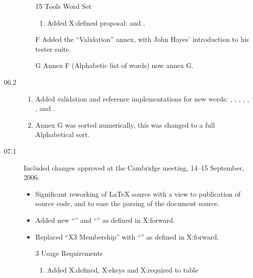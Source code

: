\begin{description}
\begin{enumerate}
	\item[15] Tools Word Set
		\begin{enumerate}
		\item Added \textsf{X:defined} proposal:
			 and
			.
		\end{enumerate}

	\item[F] Added the ``Validation'' annex, with John Hayes'
		introduction to his tester suite.

	\item[G] Annex F (Alphabetic list of words) now annex G.
	\end{enumerate}


\item[06.2]
	\begin{enumerate}
	\item Added validation and reference implementations for new words:
		,
		,
		,
		,
		,
		,
		 and
		.

	\item Annex G was sorted numerically, this was changed to a full
		Alphabetical sort.
	\end{enumerate}


\item[07.1]
	Included changes approved at the Cambridge meeting,
	14--15 September, 2006:
	\begin{itemize}
	\item Significant reworking of \LaTeX{} source with a view to
		publication of source code, and to ease the parsing of the
		document source.

	\item Added new ``'' and ``'' as defined
		in \textsf{X:forward}.

	\item Replaced ``X3 Membership'' with ``'' as
		defined in \textsf{X:forward}.

	\item[3] Usage Requirements
		\begin{enumerate}
		\item Added
			\textsf{X:defined},
			\textsf{X:ekeys} and
			\textsf{X:required}
			to table 
		\end{enumerate}


\end{itemize}
\end{description}
